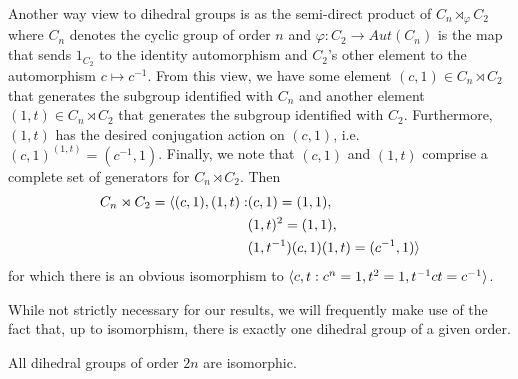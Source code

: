\documentclass[main.tex]{subfiles}
\begin{document}
Another way view to dihedral groups is as the semi-direct product of $C_n \rtimes_\varphi C_2$ where $C_n$ denotes the cyclic group of order $n$ and $\varphi : C_2 \to Aut(C_n)$ is the map that sends $1_{C_2}$ to the identity automorphism and $C_2$'s other element to the automorphism $c \mapsto c^{-1}$. From this view, we have some element $(c, 1) \in C_n \rtimes C_2$ that generates the subgroup identified with $C_n$ and another element $(1, t) \in C_n \rtimes C_2$ that generates the subgroup identified with $C_2$. Furthermore, $(1, t)$ has the desired conjugation action on $(c, 1)$, i.e. $(c,1)^{(1,t)} = (c^{-1}, 1)$. Finally, we note that $(c, 1)$ and $(1, t)$ comprise a complete set of generators for $C_n \rtimes C_2$. Then 
\begin{align*}
C_n \rtimes C_2 = \langle (c, 1), (1, t) : &(c, 1) = (1, 1), \\
&(1, t)^2 = (1, 1), \\
&(1, t^{-1})(c, 1)(1, t) = (c^{-1}, 1) \rangle
\end{align*}
for which there is an obvious isomorphism to $\langle c, t : c^n = 1, t^2 = 1, t^{-1} c t = c^{-1} \rangle$.

\hss

While not strictly necessary for our results, we will frequently make use of the fact that, up to isomorphism, there is exactly one dihedral group of a given order.

\begin{proposition}
All dihedral groups of order $2n$ are isomorphic.
\end{proposition}
\end{document}

